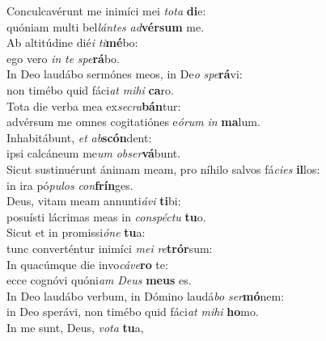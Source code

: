 \evenverse Conculcavérunt me inimíci mei \textit{to}\textit{ta} \textbf{di}e:~\*\\
\evenverse quóniam multi bel\textit{lán}\textit{tes} \textit{ad}\textbf{vér}\textbf{sum} me.\\
\oddverse Ab altitúdine dié\textit{i} \textit{ti}\textbf{mé}bo:~\*\\
\oddverse ego vero \textit{in} \textit{te} \textit{spe}\textbf{rá}bo.\\
\evenverse In Deo laudábo sermónes meos, in De\textit{o} \textit{spe}\textbf{rá}vi:~\*\\
\evenverse non timébo quid fáci\textit{at} \textit{mi}\textit{hi} \textbf{ca}ro.\\
\oddverse Tota die verba mea ex\textit{se}\textit{cra}\textbf{bán}tur:~\*\\
\oddverse advérsum me omnes cogitatiónes e\textit{ó}\textit{rum} \textit{in} \textbf{ma}lum.\\
\evenverse Inhabitábunt, \textit{et} \textit{ab}\textbf{scón}dent:~\*\\
\evenverse ipsi calcáneum me\textit{um} \textit{ob}\textit{ser}\textbf{vá}bunt.\\
\oddverse Sicut sustinuérunt ánimam meam, pro níhilo salvos fá\textit{ci}\textit{es} \textbf{il}los:~\*\\
\oddverse in ira pó\textit{pu}\textit{los} \textit{con}\textbf{frín}ges.\\
\evenverse Deus, vitam meam annunti\textit{á}\textit{vi} \textbf{ti}bi:~\*\\
\evenverse posuísti lácrimas meas in \textit{con}\textit{spé}\textit{ctu} \textbf{tu}o.\\
\oddverse Sicut et in promissi\textit{ó}\textit{ne} \textbf{tu}a:~\*\\
\oddverse tunc converténtur inimíci \textit{me}\textit{i} \textit{re}\textbf{trór}sum:\\
\evenverse In quacúmque die invo\textit{cá}\textit{ve}\textbf{ro} te:~\*\\
\evenverse ecce cognóvi quóni\textit{am} \textit{De}\textit{us} \textbf{me}\textbf{us} es.\\
\oddverse In Deo laudábo verbum, in Dómino laudá\textit{bo} \textit{ser}\textbf{mó}nem:~\*\\
\oddverse in Deo sperávi, non timébo quid fáci\textit{at} \textit{mi}\textit{hi} \textbf{ho}mo.\\
\evenverse In me sunt, Deus, \textit{vo}\textit{ta} \textbf{tu}a,~\*\\
